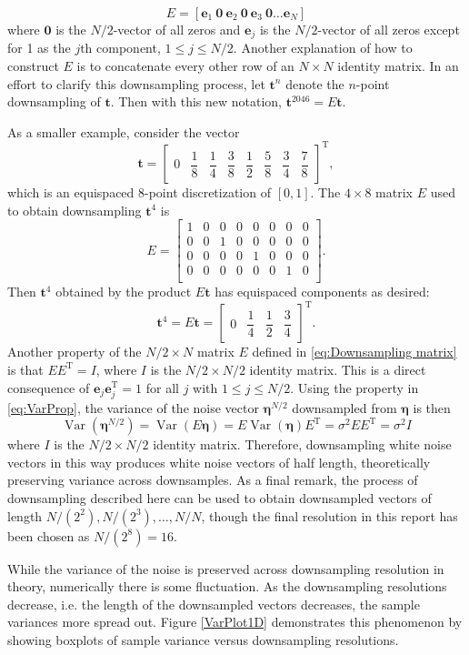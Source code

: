 \documentclass[12pt]{article}
\newcommand{\tdis}{\mathbf{t}}
\newcommand{\trans}{\mathrm{T}}	%
\newcommand{\noiseSD}{\sigma}	%
\newcommand{\noise}{\bm{\eta}}	%
\newcommand{\Var}{\operatorname{Var}}	%
\begin{document}
\begin{equation}
E = [\mathbf{e}_1 \: \mathbf{0} \: \mathbf{e}_2 \: \mathbf{0} \: \mathbf{e}_3 \: \mathbf{0} \ldots \mathbf{e}_N]
\label{eq:Downsampling matrix}
\end{equation}
where $\mathbf{0}$ is the $N/2$-vector of all zeros and $\mathbf{e}_j$ is the $N/2$-vector of all zeros except for 1 as the $j\text{th}$ component, $1 \leq j \leq N/2$. Another explanation of how to construct $E$ is to concatenate every other row of an $N \times N$ identity matrix. In an effort to clarify this downsampling process, let $\tdis^{n}$ denote the $n$-point downsampling of $\tdis$. Then with this new notation, $\tdis^{2046} = E\tdis$. \par
As a smaller example, consider the vector
\[\tdis = \begin{bmatrix}
0 & \dfrac{1}{8} & \dfrac{1}{4} & \dfrac{3}{8} & \dfrac{1}{2} & \dfrac{5}{8} & \dfrac{3}{4} & \dfrac{7}{8}
\end{bmatrix}^{\trans},\]
which is an equispaced 8-point discretization of $[0,1]$. The $4 \times 8$ matrix $E$ used to obtain downsampling $\tdis^{4}$ is
\[E = \begin{bmatrix}
1 & 0 & 0 & 0 & 0 & 0 & 0 & 0 \\
0 & 0 & 1 & 0 & 0 & 0 & 0 & 0 \\
0 & 0 & 0 & 0 & 1 & 0 & 0 & 0 \\
0 & 0 & 0 & 0 & 0 & 0 & 1 & 0 \\
\end{bmatrix}.\]
Then $\tdis^4$ obtained by the product $E\tdis$ has equispaced components as desired:
\[\tdis^4 = E\tdis = \begin{bmatrix}
0 & \dfrac{1}{4} & \dfrac{1}{2} & \dfrac{3}{4}
\end{bmatrix}^{\trans}.\]
\indent Another property of the $N/2 \times N$ matrix $E$ defined in \eqref{eq:Downsampling matrix} is that $EE^{\trans} = I$, where $I$ is the $N/2 \times N/2$ identity matrix.  This is a direct consequence of $\mathbf{e}_j\mathbf{e}_j^\trans = 1$ for all $j$ with $1 \leq j \leq N/2$. Using the property in \eqref{eq:VarProp}, the variance of the  noise vector $\noise^{N/2}$ downsampled from $\noise$ is then
\[\Var(\noise^{N/2}) = \Var(E\noise) = E\Var(\noise)E^{\trans} = \noiseSD^2EE^{\trans} = \noiseSD^2I\]
where $I$ is the $N/2 \times N/2$ identity matrix. Therefore, downsampling white noise vectors in this way produces white noise vectors of half length, theoretically preserving variance across downsamples. As a final remark, the process of downsampling described here can be used to obtain downsampled vectors of length $N/(2^2), N/(2^3), \ldots, N/N$, though the final resolution in this report has been chosen as $N/(2^8) = 16$. \par 
While the variance of the noise is preserved across downsampling resolution in theory, numerically there is some fluctuation. As the downsampling resolutions decrease, i.e. the length of the downsampled vectors decreases, the sample variances more spread out. Figure \ref{VarPlot1D} demonstrates this phenomenon by showing boxplots of sample variance versus downsampling resolutions. 
\end{document}
